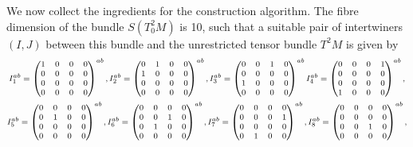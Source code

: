 We now collect the ingredients for the construction algorithm. The fibre dimension of the bundle $S(T^2_0M)$ is 10, such that a suitable pair of intertwiners $(I,J)$ between this bundle and the unrestricted tensor bundle $T^2M$ is given by
\begin{equation}
  \footnotesize
  \begin{gathered}
  I^{ab}_1 = \begin{pmatrix}1 & 0 & 0 & 0 \\ 0 & 0 & 0 & 0 \\ 0 & 0 & 0 & 0 \\ 0 & 0 & 0 & 0\end{pmatrix}^{ab}, I^{ab}_2 = \begin{pmatrix}0 & 1 & 0 & 0 \\ 1 & 0 & 0 & 0 \\ 0 & 0 & 0 & 0 \\ 0 & 0 & 0 & 0\end{pmatrix}^{ab}, I^{ab}_3 = \begin{pmatrix}0 & 0 & 1 & 0 \\ 0 & 0 & 0 & 0 \\ 1 & 0 & 0 & 0 \\ 0 & 0 & 0 & 0\end{pmatrix}^{ab} I^{ab}_4 = \begin{pmatrix}0 & 0 & 0 & 1 \\ 0 & 0 & 0 & 0 \\ 0 & 0 & 0 & 0 \\ 1 & 0 & 0 & 0\end{pmatrix}^{ab}, \\
  I^{ab}_5 = \begin{pmatrix}0 & 0 & 0 & 0 \\ 0 & 1 & 0 & 0 \\ 0 & 0 & 0 & 0 \\ 0 & 0 & 0 & 0\end{pmatrix}^{ab}, I^{ab}_6 = \begin{pmatrix}0 & 0 & 0 & 0 \\ 0 & 0 & 1 & 0 \\ 0 & 1 & 0 & 0 \\ 0 & 0 & 0 & 0\end{pmatrix}^{ab}, I^{ab}_7 = \begin{pmatrix}0 & 0 & 0 & 0 \\ 0 & 0 & 0 & 1 \\ 0 & 0 & 0 & 0 \\ 0 & 1 & 0 & 0\end{pmatrix}^{ab}, I^{ab}_8 = \begin{pmatrix}0 & 0 & 0 & 0 \\ 0 & 0 & 0 & 0 \\ 0 & 0 & 1 & 0 \\ 0 & 0 & 0 & 0\end{pmatrix}^{ab}, \\

\end{gathered}
\end{equation}
